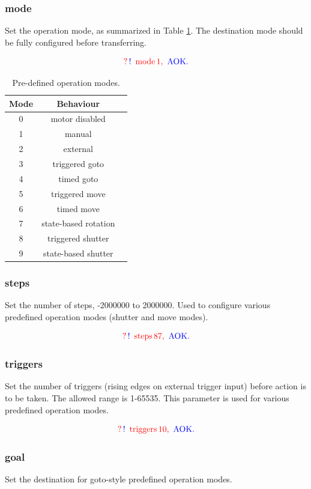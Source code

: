 \documentclass[10pt]{article}
\newcommand{\exchange}[2]{
\begin{equation}
 \nonumber \textcolor{red}{?} \, \textcolor{blue}{!} \, \textcolor{red}{\text { #1}} \,\textcolor{red}{\text{#2, }} \, \textcolor{blue}{\text{AOK.}}
 \end{equation}
}
\begin{document}
\subsubsection{mode}
\label{mode}
Set the operation mode, as summarized in Table \ref{Operation_Modes_Table}.  The destination mode should be fully configured before transferring.   

\exchange{mode}{1}

\begin{table}[!htb]
\centering
\begin{tabular}{|c|c|c|}
\hline
Mode & Behaviour \\ \hline
0 & motor disabled \\ \hline
1 & manual \\ \hline
2 & external \\ \hline
3 & triggered goto \\ \hline
4 & timed goto \\\hline
5 & triggered move \\ \hline
6 & timed move \\ \hline
7 & state-based rotation \\ \hline
8 & triggered shutter \\ \hline
9 & state-based shutter \\ \hline
\end{tabular}
\caption{Pre-defined operation modes.}
\label{Operation_Modes_Table}
\end{table}

\subsubsection{steps}
\label{steps}
Set the number of steps, -2000000 to 2000000.  Used to configure various predefined operation modes (shutter and move modes).

\exchange{steps}{87}

\subsubsection{triggers}
\label{triggers}
Set the number of triggers (rising edges on external trigger input) before action is to be taken.  The allowed range is 1-65535.  This parameter is used for various predefined operation modes.

\exchange{triggers}{10}

\subsubsection{goal}
\label{goal}
Set the destination for goto-style predefined operation modes.
\end{document}
